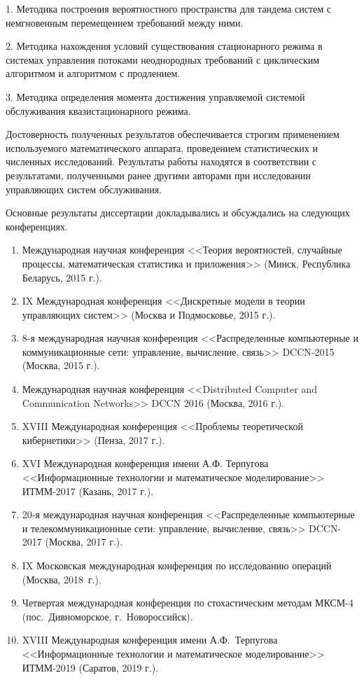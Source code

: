 {}

1. Методика построения вероятностного пространства для тандема систем с немгновенным перемещением требований между ними.

2. Методика нахождения условий существования стационарного режима в системах управления потоками неоднородных требований с циклическим алгоритмом и алгоритмом с продлением.

3. Методика определения момента достижения управляемой системой обслуживания квазистационарного режима.





{\probation} Достоверность полученных результатов обеспечивается строгим применением используемого математического аппарата, проведением статистических и численных исследований. Результаты работы находятся в соответствии с результатами, полученными ранее другими авторами при исследовании управляющих систем обслуживания.

Основные результаты диссертации докладывались и обсуждались на следующих  конференциях.
\begin{enumerate}
    \item Международная научная конференция <<Теория вероятностей, случайные процессы, математическая статистика и приложения>> (Минск, Республика Беларусь, 2015 г.).
    \item IX Международная конференция <<Дискретные модели в теории управляющих систем>> (Москва и Подмосковье, 2015 г.).
\item 8-я международная научная конференция <<Распределенные компьютерные и коммуникационные сети: управление, вычисление, связь>> DCCN-2015 (Москва, 2015 г.).
\item Международная научная конференция <<Distributed Computer and Communication Networks>> DCCN 2016 (Москва, 2016 г.).
\item XVIII Международная конференция <<Проблемы теоретической кибернетики>> (Пенза, 2017 г.).
\item XVI Международная конференция имени А.Ф. Терпугова <<Информационные технологии и математическое моделирование>> ИТММ-2017 (Казань, 2017 г.).
\item  20-я международная научная конференция <<Распределенные компьютерные и телекоммуникационные сети: управление, вычисление, связь>> DCCN-2017 (Москва, 2017 г.).
\item IX Московская международная конференция по исследованию операций (Москва, 2018~г.).
\item Четвертая международная конференция по стохастическим методам МКСМ-4 (пос.~Дивноморское, г.~Новороссийск).
\item XVIII Международная конференция имени А.Ф.~Терпугова <<Информационные технологии и математическое моделирование>> ИТММ-2019 (Саратов, 2019 г.).
\end{enumerate}


